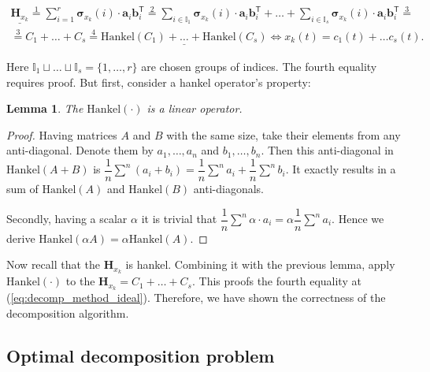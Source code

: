 \documentclass[referee, pdflatex, sn-mathphys-num]{sn-jnl}
\theoremstyle{definition}
\theoremstyle{plain}
\newtheorem{Lem}{Lemma}
\begin{document}
	\begin{multline}\label{eq:decomp_method_ideal}
		\underline{\mathbf{H}_{x_k}} \overset{1}{=} \sum\limits_{i = 1}^{r} \boldsymbol{\sigma}_{x_k}(i) \cdot \mathbf{a}_i  \mathbf{b}_i^{\mathsf{T}} \overset{2}{=} \sum\limits_{i \in \mathbb{I}_1} \boldsymbol{\sigma}_{x_k}(i) \cdot \mathbf{a}_i  \mathbf{b}_i^{\mathsf{T}} + \ldots + \sum\limits_{i \in \mathbb{I}_s} \boldsymbol{\sigma}_{x_k}(i) \cdot \mathbf{a}_i  \mathbf{b}_i^{\mathsf{T}} \overset{3}{=} \\ \overset{3}{=} C_1 + \ldots + C_s \overset{4}{=} \underline{\text{Hankel}(C_1) + \ldots + \text{Hankel}(C_s)}  \Leftrightarrow x_k(t) = c_1(t) + \ldots c_s(t).
	\end{multline}
	
	Here $ \mathbb{I}_1 \sqcup \ldots \sqcup \mathbb{I}_s = \{1, \ldots, r\} $ are chosen groups of indices. The fourth equality requires proof. But first, consider a hankel operator's property:
	
	\begin{Lem}
		The $ \text{Hankel}(\cdot) $ is a linear operator.
	\end{Lem}
	
	\begin{proof}		
		Having matrices $ A $ and $ B $ with the same size, take their elements from any anti-diagonal. Denote them by $ a_1, \ldots, a_n $ and $ b_1, \ldots, b_n $. Then this anti-diagonal in $ \text{Hankel}(A + B) $ is $ \dfrac{1}{n} \sum\limits^n (a_i + b_i) = \dfrac{1}{n} \sum\limits^n a_i + \dfrac{1}{n} \sum\limits^n b_i $. It exactly results in a sum of $ \text{Hankel}(A) $ and $ \text{Hankel}(B) $ anti-diagonals.
		
		Secondly, having a scalar $ \alpha $ it is trivial that $ \dfrac{1}{n} \sum\limits^n \alpha \cdot a_i = \alpha \dfrac{1}{n} \sum\limits^n a_i $. Hence we derive $ \text{Hankel}(\alpha A) = \alpha \text{Hankel}(A) $.
	\end{proof}
	
	Now recall that the $ \mathbf{H}_{x_k} $ is hankel. Combining it with the previous lemma, apply $ \text{Hankel}(\cdot) $ to the $ \mathbf{H}_{x_k} = C_1 + \ldots + C_s $. This proofs the fourth equality at (\ref{eq:decomp_method_ideal}). Therefore, we have shown the correctness of the decomposition algorithm.
	
	\subsection{Optimal decomposition problem}\label{sec:optimal_decomp}
	
\end{document}
